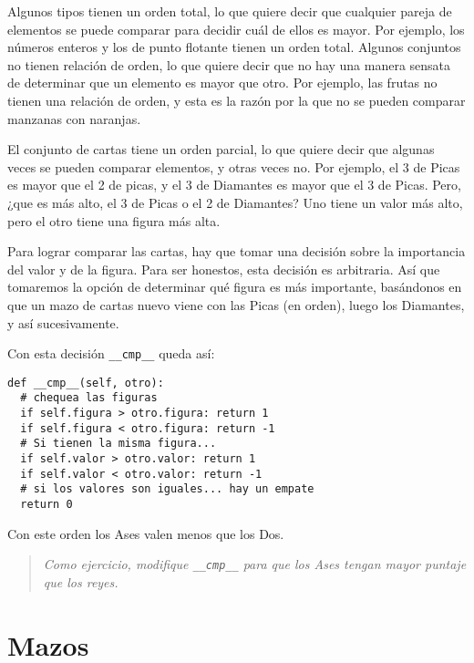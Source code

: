 
Algunos tipos tienen un orden total, lo que quiere decir que cualquier pareja de elementos 
se puede comparar para decidir cuál de ellos es mayor. Por ejemplo, los números enteros y 
los de punto flotante tienen un orden total. Algunos conjuntos no tienen relación de orden, 
lo que quiere decir que no hay una manera sensata de determinar que un elemento es mayor 
que otro. Por ejemplo, las frutas no tienen una relación de orden, y esta es la razón por 
la que no se pueden comparar manzanas con naranjas.

El conjunto de cartas tiene un orden parcial, lo que quiere decir que algunas veces se pueden 
comparar elementos, y otras veces no. Por ejemplo, el 3 de Picas es mayor que el 2 de picas, 
y el 3 de Diamantes es mayor que el 3 de Picas. Pero, ¿que es más alto, el 3 de Picas o el 2 
de Diamantes? Uno tiene un valor más alto, pero el otro tiene una figura más alta.


Para lograr comparar las cartas, hay que tomar una decisión sobre la importancia del valor 
y de la figura. Para ser honestos, esta decisión es arbitraria. Así que tomaremos la opción 
de determinar qué figura es más importante, basándonos en que un mazo de cartas nuevo viene con 
las Picas (en orden), luego los Diamantes, y así sucesivamente.

Con esta decisión  \texttt{\_\_cmp\_\_} queda así:

\beforeverb
\begin{verbatim}
def __cmp__(self, otro):
  # chequea las figuras
  if self.figura > otro.figura: return 1
  if self.figura < otro.figura: return -1
  # Si tienen la misma figura... 
  if self.valor > otro.valor: return 1
  if self.valor < otro.valor: return -1
  # si los valores son iguales... hay un empate
  return 0
\end{verbatim}
\afterverb
%
Con este orden los Ases valen menos que los Dos.

\begin{quote}
{\em Como ejercicio, modifique \texttt{\_\_cmp\_\_} para que los Ases tengan mayor puntaje que los reyes.}
\end{quote}


\section{Mazos}

